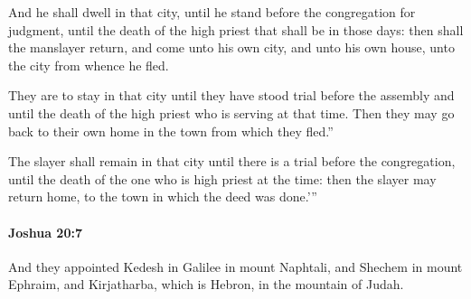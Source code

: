 			\begin{versebox}
					\item[BHS] 
					\item[ASV] And he shall dwell in that city, until he stand before the congregation for judgment, until the death of the high priest that shall be in those days: then shall the manslayer return, and come unto his own city, and unto his own house, unto the city from whence he fled.
					\item[NIV] They are to stay in that city until they have stood trial before the assembly and until the death of the high priest who is serving at that time. Then they may go back to their own home in the town from which they fled.”
					\item[NRSV] The slayer shall remain in that city until there is a trial before the congregation, until the death of the one who is high priest at the time: then the slayer may return home, to the town in which the deed was done.’”
			\end{versebox}

		\paragraph{Joshua 20:7} %
			\label{JOSHUA-20-7}

			And they appointed Kedesh in Galilee in mount Naphtali, and Shechem in mount Ephraim, and Kirjatharba, which is Hebron, in the mountain of Judah.

